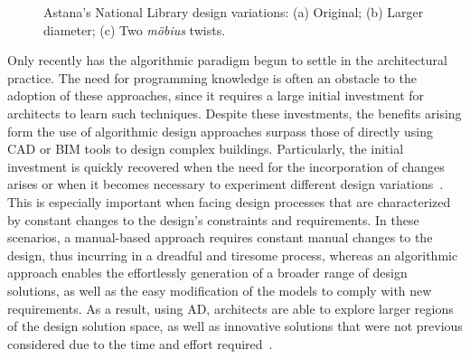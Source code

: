 \begin{figure}[htbp]
\centering
{}%
\hfill
{}%
\hfill
{}%

\caption[Design variations of the Astana's National Library]{Astana's National Library design variations: (a) Original; (b) Larger diameter; (c) Two \textit{möbius} twists.}
\label{fig:astana}
\end{figure}

Only recently has the algorithmic paradigm begun to settle in the architectural practice. The need for programming knowledge is often an obstacle to the adoption of these approaches, since it requires a large initial investment for architects to learn such techniques. Despite these investments, the benefits arising form the use of algorithmic design approaches surpass those of directly using \ac{CAD} or \ac{BIM} tools  to design complex buildings. Particularly, the initial investment is quickly recovered when the need for the incorporation of changes arises or when it becomes necessary to experiment different design variations~\cite{Leitao2014GD}. This is especially important when facing design processes that are characterized by constant changes to the design's constraints and requirements. In these scenarios, a manual-based approach requires constant manual changes to the design, thus incurring in a dreadful and tiresome process, whereas an algorithmic approach enables the effortlessly generation of a broader range of design solutions, as well as the easy modification of the models to comply with new requirements. As a result, using \ac{AD}, architects are able to explore larger regions of the design solution space, as well as innovative solutions that were not previous considered due to the time and effort required~\cite{Leitao2014GD}.

